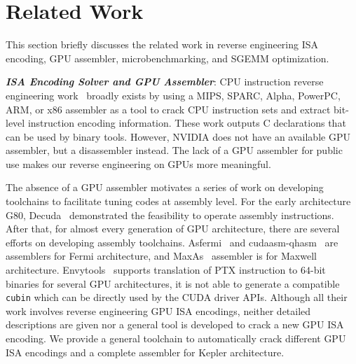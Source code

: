 \section{Related Work}
\label{sec:related}
This section briefly discusses the related work in reverse engineering ISA encoding, GPU assembler, microbenchmarking, and SGEMM optimization.

{\em {\bf ISA Encoding Solver and GPU Assembler}}:
CPU instruction reverse engineering work~\cite{collberg1997reverse,hsieh2001reverse} broadly exists by using a MIPS, SPARC, Alpha, PowerPC, ARM, or x86 assembler as a tool to crack CPU instruction sets and extract bit-level instruction encoding information. 
These work outputs C declarations that can be used by binary tools. 
However, NVIDIA does not have an available GPU assembler, but a disassembler instead. 
The lack of a GPU assembler for public use makes our reverse engineering on GPUs more meaningful. 


The absence of a GPU assembler motivates a series of work on developing toolchains to facilitate tuning codes at assembly level. 
For the early architecture G80, Decuda~\cite{decuda} demonstrated the feasibility to operate
assembly instructions. 
After that, for almost every generation of GPU architecture, there are several 
efforts on developing assembly toolchains. 
Asfermi~\cite{asfermi} and cudaasm-qhasm~\cite{bernstein2012usable} are assemblers for Fermi architecture, and MaxAs~\cite{maxas} assembler is for Maxwell architecture. 
Envytools~\cite{envytools} supports translation of PTX instruction to $64$-bit binaries 
for several GPU architectures, it is not able to generate a compatible {\tt cubin} which can be directly used by the CUDA driver APIs. %
Although all their work involves reverse engineering GPU ISA encodings, neither detailed descriptions are given nor a general tool is developed to crack a new GPU ISA encoding. 
We provide a general toolchain to automatically crack different GPU ISA encodings and a complete assembler for Kepler architecture.

